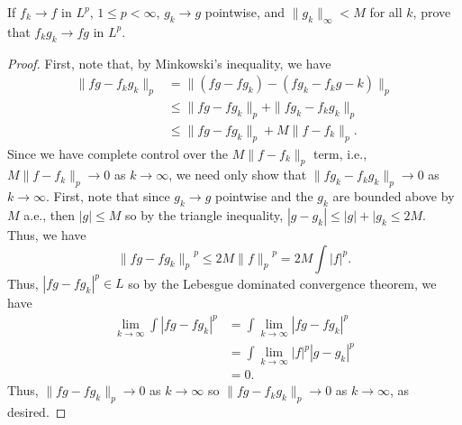 \begin{problem}
If $f_k\to f$ in $L^p$, $1\leq p<\infty$, $g_k\to g$ pointwise, and
$\|g_k\|_\infty<M$ for all $k$, prove that $f_kg_k\to fg$ in $L^p$.
\end{problem}
\begin{proof}
First, note that, by Minkowski's inequality, we have
\[
\begin{aligned}
\|fg-f_kg_k\|_p
&=\|(fg-fg_k)-(fg_k-f_kg-k)\|_p\\
&\leq\|fg-fg_k\|_p+\|fg_k-f_kg_k\|_p\\
&\leq\|fg-fg_k\|_p+M\|f-f_k\|_p.
\end{aligned}
\]
Since we have complete control over the $M\|f-f_k\|_p$ term, i.e.,
$M\|f-f_k\|_p\to 0$ as $k\to\infty$, we need only show that
$\|fg_k-f_kg_k\|_p\to 0$ as $k\to\infty$. First, note that since $g_k\to g$
pointwise and the $g_k$ are bounded above by $M$ a.e., then $|g|\leq M$ so
by the triangle inequality, $|g-g_k|\leq |g|+|g_k\leq 2M$. Thus, we have
\[
{\|fg-fg_k\|_p}^p\leq 2M{\|f\|_p}^p=2M\int|f|^p.
\]
Thus, $|fg-fg_k|^p\in L$ so by the Lebesgue dominated convergence theorem,
we have
\[
\begin{aligned}
\lim_{k\to\infty}\int|fg-fg_k|^p
&=\int\lim_{k\to\infty}|fg-fg_k|^p\\
&=\int\lim_{k\to\infty}|f|^p|g-g_k|^p\\
&=0.
\end{aligned}
\]
Thus, $\|fg-fg_k\|_p\to 0$ as $k\to\infty$ so $\|fg-f_kg_k\|_p\to 0$ as
$k\to\infty$, as desired.
\end{proof}


